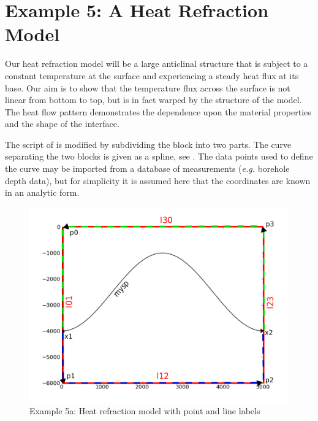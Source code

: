 
%
%
%

\section{Example 5: A Heat Refraction Model}
\label{example5}
Our heat refraction model will be a large anticlinal structure that is subject
to a constant temperature at the surface and experiencing a steady heat flux at
its base. Our aim is to show that the temperature flux across the surface is
not linear from bottom to top, but is in fact warped by the structure of the
model. The heat flow pattern demonstrates the dependence upon the material
properties and the shape of the interface.

The script of  is modified by subdividing the block into two
parts. The curve separating the two blocks is given as a spline, see
. The data points
used to define the curve may be imported from a database of measurements
(\textit{e.g.} borehole depth data), but for simplicity it is assumed here that
the coordinates are known in an analytic form.

\begin{figure}[ht]
\centerline{\includegraphics[width=4.in]{figures/anticlineheatrefraction.png}}
\caption{Example 5a: Heat refraction model with point and line labels}
\label{fig:anticlinehrmodel}
\end{figure}

